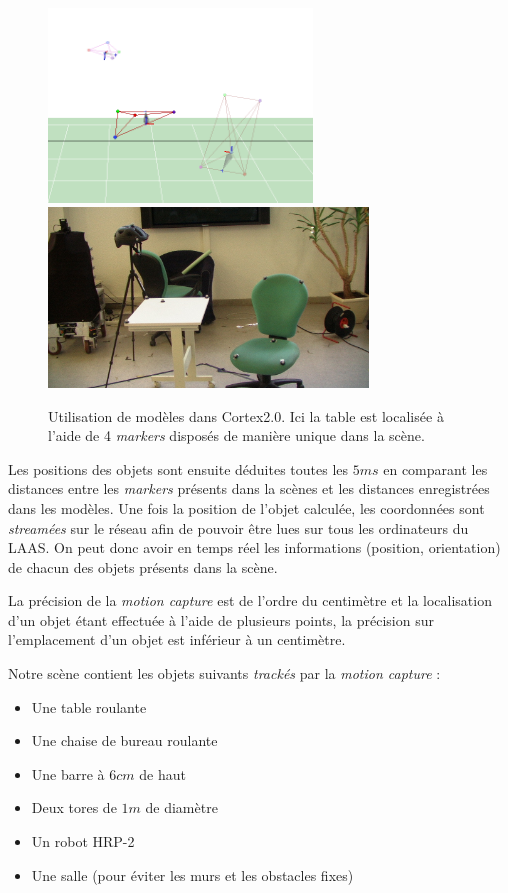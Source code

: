 \begin{figure}[h]
\begin{center}
\includegraphics[width=7cm]{images/mocap.png}
\includegraphics[width=8.5cm]{images/mocap_real_small.jpg}
\caption{Utilisation de modèles dans Cortex2.0. Ici la table est localisée à l'aide de 4 \emph{markers} disposés de manière unique dans la scène.}
\label{fig:objet}
\end{center}
\end{figure}

Les positions des objets sont ensuite déduites toutes les $5ms$ en comparant les distances entre les \emph{markers} présents dans la scènes et les distances enregistrées dans les modèles. Une fois la position de l'objet calculée, les coordonnées sont \emph{streamées} sur le réseau afin de pouvoir être lues sur tous les ordinateurs du LAAS. On peut donc avoir en temps réel les informations (position, orientation) de chacun des objets présents dans la scène.

La précision de la \emph{motion capture} est de l'ordre du centimètre et la localisation d'un objet étant effectuée à l'aide de plusieurs points, la précision sur l'emplacement d'un objet est inférieur à un centimètre.

Notre scène contient les objets suivants \emph{trackés} par la \emph{motion capture} : 
\begin{itemize}
\item Une table roulante
\item Une chaise de bureau roulante
\item Une barre à $6cm$ de haut
\item Deux tores de $1m$ de diamètre
\item Un robot HRP-2
\item Une salle (pour éviter les murs et les obstacles fixes)
\end{itemize}
\vspace{3mm}

